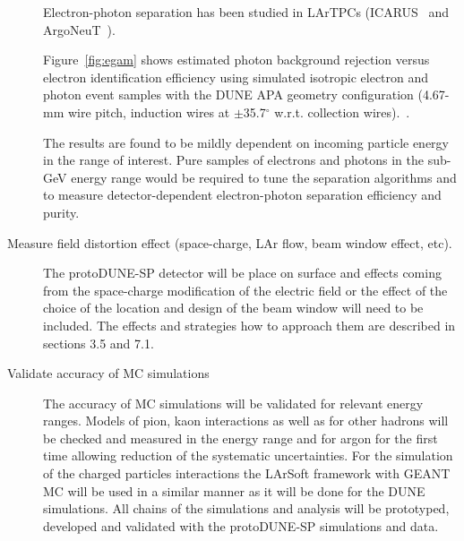 \begin{description}
Electron-photon separation has been studied in LArTPCs (ICARUS~\cite{icarus_eg} and ArgoNeuT~\cite{argoneut_eg}).

Figure~\ref{fig:egam}  shows estimated photon background rejection versus electron identification efficiency using 
simulated isotropic electron and photon event samples  with the DUNE APA geometry configuration (4.67-mm wire pitch, induction wires at $\pm$35.7$^{\circ}$ w.r.t. collection wires).~\cite{dunecdr}. 

The results are found to be mildly dependent on incoming particle energy in the range of interest. 
Pure samples of electrons and photons in the sub-GeV energy range would be
required to tune the separation algorithms and to measure 
detector-dependent electron-photon separation efficiency and purity. 


\item [Measure field distortion effect (space-charge, LAr flow, beam window effect, etc).] 

The protoDUNE-SP detector will be place on surface and effects coming from the space-charge modification of the electric field or the effect of the choice of the location and design of the beam window will need to be included. The effects and strategies how to approach them are described in sections 3.5 and 7.1.


\item [Validate accuracy of MC simulations] The accuracy of MC simulations will be validated for relevant energy ranges. Models of pion, kaon interactions as well as for other hadrons will be checked and measured in the energy range and for argon for the first time allowing reduction of the systematic uncertainties. For the simulation of the charged particles interactions the LArSoft framework with GEANT MC will be used in a similar   manner as it will be done for the DUNE simulations. All chains of the simulations and analysis will be prototyped, developed and validated with the protoDUNE-SP simulations and data. 
\end{description}



